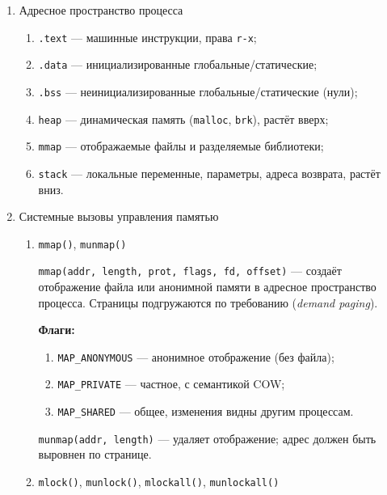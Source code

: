 \begin{enumerate}
\textbf{TLB} (Translation Lookaside Buffer) — кэш последних трансляций
<<виртуальный~\(\to\)~физический>>. TLB miss вызывает page table walk,
но \emph{не} является page fault.


\item Адресное пространство процесса \label{sec:3}

\begin{enumerate}
    \item \texttt{.text} — машинные инструкции, права \texttt{r-x};
    \item \texttt{.data} — инициализированные глобальные/статические;
    \item \texttt{.bss} — неинициализированные глобальные/статические (нули);
    \item \texttt{heap} — динамическая память (\texttt{malloc}, \texttt{brk}), растёт вверх;
    \item \texttt{mmap} — отображаемые файлы и разделяемые библиотеки;
    \item \texttt{stack} — локальные переменные, параметры, адреса возврата, растёт вниз.
\end{enumerate}

\item Системные вызовы управления памятью \label{sec:4}

\begin{enumerate}

\item \texttt{mmap()}, \texttt{munmap()}

\texttt{mmap(addr, length, prot, flags, fd, offset)} — создаёт отображение
файла или анонимной памяти в адресное пространство процесса. Страницы
подгружаются по требованию (\emph{demand paging}).

\textbf{Флаги:}
\begin{enumerate}
    \item \texttt{MAP\_ANONYMOUS} — анонимное отображение (без файла);
    \item \texttt{MAP\_PRIVATE} — частное, с семантикой COW;
    \item \texttt{MAP\_SHARED} — общее, изменения видны другим процессам.
\end{enumerate}

\texttt{munmap(addr, length)} — удаляет отображение; адрес должен быть
выровнен по странице.

\item \texttt{mlock()}, \texttt{munlock()}, \texttt{mlockall()}, \texttt{munlockall()}


\end{enumerate}
\end{enumerate}
